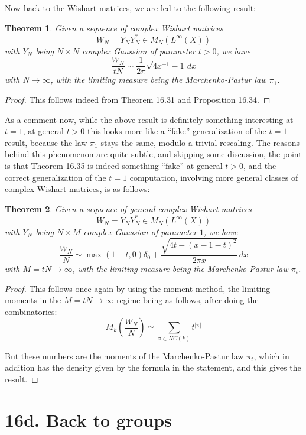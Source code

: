\documentclass[12pt]{amsbook}
\newtheorem{theorem}{Theorem}[chapter]
\begin{document}
Now back to the Wishart matrices, we are led to the following result:

\begin{theorem}
Given a sequence of complex Wishart matrices
$$W_N=Y_NY_N^*\in M_N(L^\infty(X))$$
with $Y_N$ being $N\times N$ complex Gaussian of parameter $t>0$, we have
$$\frac{W_N}{tN}\sim\frac{1}{2\pi}\sqrt{4x^{-1}-1}\,dx$$
with $N\to\infty$, with the limiting measure being the Marchenko-Pastur law $\pi_1$.
\end{theorem}

\begin{proof}
This follows indeed from Theorem 16.31 and Proposition 16.34.
\end{proof}

As a comment now, while the above result is definitely something interesting at $t=1$, at general $t>0$ this looks more like a ``fake'' generalization of the $t=1$ result, because the law $\pi_1$ stays the same, modulo a trivial rescaling. The reasons behind this phenomenon are quite subtle, and skipping some discussion, the point is that Theorem 16.35 is indeed something ``fake'' at general $t>0$, and the correct generalization of the $t=1$ computation, involving more general classes of complex Wishart matrices, is as follows:

\begin{theorem}
Given a sequence of general complex Wishart matrices
$$W_N=Y_NY_N^*\in M_N(L^\infty(X))$$
with $Y_N$ being $N\times M$ complex Gaussian of parameter $1$, we have
$$\frac{W_N}{N}\sim\max(1-t,0)\delta_0+\frac{\sqrt{4t-(x-1-t)^2}}{2\pi x}\,dx$$
with $M=tN\to\infty$, with the limiting measure being the Marchenko-Pastur law $\pi_t$.
\end{theorem}

\begin{proof}
This follows once again by using the moment method, the limiting moments in the $M=tN\to\infty$ regime being as follows, after doing the combinatorics:
$$M_k\left(\frac{W_N}{N}\right)\simeq\sum_{\pi\in NC(k)}t^{|\pi|}$$

But these numbers are the moments of the Marchenko-Pastur law $\pi_t$, which in addition has the density given by the formula in the statement, and this gives the result.
\end{proof}

\section*{16d. Back to groups}
\end{document}
